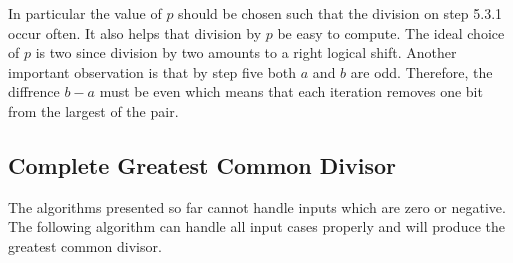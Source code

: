 \documentclass[b5paper]{book}
\begin{document}
In particular the value of $p$ should be chosen such that the division on step 5.3.1 occur often.  It also helps that division by $p$ be easy
to compute.  The ideal choice of $p$ is two since division by two amounts to a right logical shift.  Another important observation is that by
step five both $a$ and $b$ are odd.  Therefore, the diffrence $b - a$ must be even which means that each iteration removes one bit from the 
largest of the pair.

\subsection{Complete Greatest Common Divisor}
The algorithms presented so far cannot handle inputs which are zero or negative.  The following algorithm can handle all input cases properly
and will produce the greatest common divisor.
\end{document}
